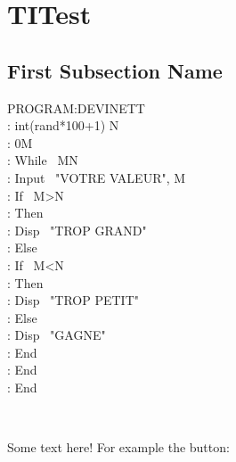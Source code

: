 \section{TITest}

\subsection[Short First Subsection Name]{First Subsection Name}

\begin{frame}

	\noindent\begin{minipage}{0.48\linewidth}
	\begin{ticalc}
		PROGRAM:DEVINETT				\\
	    : int(rand*100+1) \>N			\\
	    : 0\>M							\\
	    : While \ M\!N					\\
	    : Input \ "VOTRE VALEUR", M		\\
	    : If \ M>N						\\
	    : Then							\\
	    : Disp \ "TROP GRAND"			\\
	    : Else							\\
	    : If \ M<N						\\
	    : Then							\\
	    : Disp \ "TROP PETIT"			\\
	    : Else							\\
	    : Disp \ "GAGNE"				\\
	    : End							\\
	    : End							\\
	    : End
	\end{ticalc}
	\end{minipage}
	\,\,
	\noindent\begin{minipage}{0.48\linewidth}
		Some text here! For example the button:
	\end{minipage}

\end{frame}


